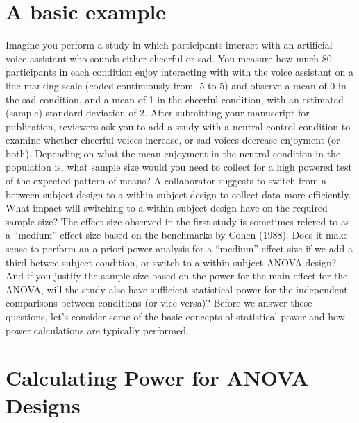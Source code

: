 \documentclass[,man,floatsintext]{apa6}
\begin{document}
\hypertarget{a-basic-example}{%
\section{A basic example}\label{a-basic-example}}

Imagine you perform a study in which participants interact with an artificial voice assistant who sounds either cheerful or sad.
You measure how much 80 participants in each condition enjoy interacting with with the voice assistant on a line marking scale (coded continuously from -5 to 5) and observe a mean of 0 in the sad condition, and a mean of 1 in the cheerful condition, with an estimated (sample) standard deviation of 2.
After submitting your manuscript for publication, reviewers ask you to add a study with a neutral control condition to examine whether cheerful voices increase, or sad voices decrease enjoyment (or both).
Depending on what the mean enjoyment in the neutral condition in the population is, what sample size would you need to collect for a high powered test of the expected pattern of means?
A collaborator suggests to switch from a between-subject design to a within-subject design to collect data more efficiently.
What impact will switching to a within-subject design have on the required sample size?
The effect size observed in the first study is sometimes refered to as a \enquote{medium} effect size based on the benchmarks by Cohen (1988).
Does it make sense to perform an a-priori power analysis for a \enquote{medium} effect size if we add a third betwee-subject condition, or switch to a within-subject ANOVA design?
And if you justify the sample size based on the power for the main effect for the ANOVA, will the study also have sufficient statistical power for the independent comparisons between conditions (or vice versa)?
Before we answer these questions, let's consider some of the basic concepts of statistical power and how power calculations are typically performed.

\hypertarget{calculating-power-for-anova-designs}{%
\section{Calculating Power for ANOVA Designs}\label{calculating-power-for-anova-designs}}
\end{document}
